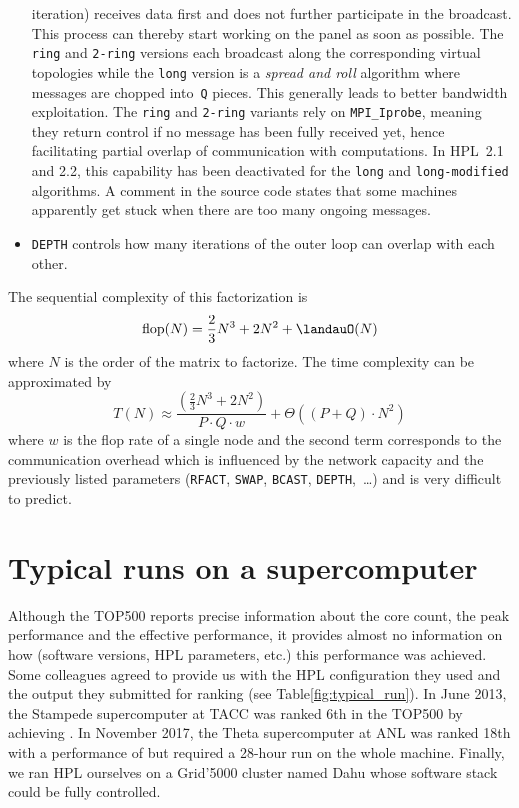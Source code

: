 \begin{itemize}
                iteration) receives data first and does not further participate in the broadcast. This process can thereby
                start working on the panel as soon as possible. The \texttt{ring} and \texttt{2-ring} versions each
                broadcast along the corresponding virtual topologies while the \texttt{long} version is a \emph{spread and
                roll} algorithm where messages are chopped into \texttt{Q} pieces. This generally leads to better bandwidth
                exploitation. The \texttt{ring} and \texttt{2-ring} variants rely on \texttt{MPI\_Iprobe}, meaning they
                return control if no message has been fully received yet, hence facilitating partial overlap of
                communication with computations.  In HPL 2.1 and 2.2, this capability has been deactivated for the
                \texttt{long} and \texttt{long-modified} algorithms. A comment in the source code states that some machines
                apparently get stuck when there are too many ongoing messages.
            \item \texttt{DEPTH} controls how many iterations of the outer loop can overlap with each other.
        \end{itemize}

        The sequential complexity of this factorization is \[\mathrm{flop}(N) = \frac{2}{3}N^3 + 2N^2 + \landauO(N)\] where $N$ is
        the order of the matrix to factorize. The time complexity can be approximated by \[T(N) \approx
        \frac{\left(\frac{2}{3}N^3 + 2N^2\right)}{P\cdot{}Q\cdot{}w} + \Theta((P+Q)\cdot{}N^2)\] where $w$ is the flop rate
        of a single node and the second term corresponds to the communication overhead which is influenced by the network
        capacity and the previously listed parameters (\texttt{RFACT}, \texttt{SWAP}, \texttt{BCAST},
        \texttt{DEPTH}, \ldots) and is very difficult to predict.

    \section{Typical runs on a supercomputer}%
    \label{sec:hpl:typical_runs}

        Although the TOP500 reports precise information about the core count,
        the peak performance and the effective performance, it provides almost
        no information on how (software versions, HPL parameters, etc.) this
        performance was achieved. Some colleagues agreed to provide us with
        the HPL configuration they used and the output they submitted for
        ranking (see Table\ref{fig:typical_run}).
        In June 2013, the Stampede supercomputer at TACC was ranked
        6th in the TOP500 by achieving . In November
        2017, the Theta supercomputer at ANL was ranked 18th with a performance of 
        but required a 28-hour run on the
        whole machine. Finally, we ran HPL ourselves on a Grid'5000 cluster
        named Dahu whose software stack could be fully controlled.

